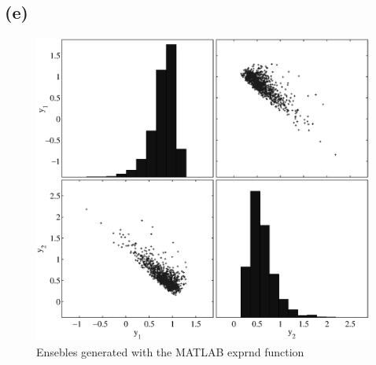 \documentclass[fleqn, letterpaper]{tufte-handout}
\begin{document}
\subsection{(e)}
\begin{figure}
        \includegraphics[width=\textwidth]{problem2e}
        \caption{Ensebles generated with the MATLAB {\ttfamily exprnd} function}
        \label{lognorm}
\end{figure}
\end{document}
